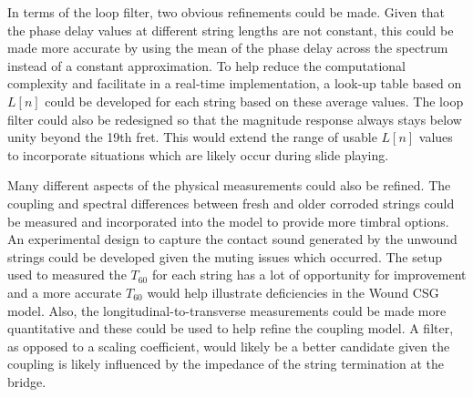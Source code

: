 \documentclass[../main.tex]{subfiles}
\begin{document}
In terms of the loop filter, two obvious refinements could be made. Given that the phase delay values at different string lengths are not constant, this could be made more accurate by using the mean of the phase delay across the spectrum instead of a constant approximation. To help reduce the computational complexity and facilitate in a real-time implementation, a look-up table based on $L[n]$ could be developed for each string based on these average values. The loop filter could also be redesigned so that the magnitude response always stays below unity beyond the 19th fret. This would extend the range of usable $L[n]$ values to incorporate situations which are likely occur during slide playing.

Many different aspects of the physical measurements could also be refined. The coupling and spectral differences between fresh and older corroded strings could be measured and incorporated into the model to provide more timbral options. An experimental design to capture the contact sound generated by the unwound strings could be developed given the muting issues which occurred. The setup used to measured the $T_{60}$ for each string has a lot of opportunity for improvement and a more accurate $T_{60}$ would help illustrate deficiencies in the Wound CSG model. Also, the longitudinal-to-transverse measurements could be made more quantitative and these could be used to help refine the coupling model. A filter, as opposed to a scaling coefficient, would likely be a better candidate given the coupling is likely influenced by the impedance of the string termination at the bridge.
\end{document}
